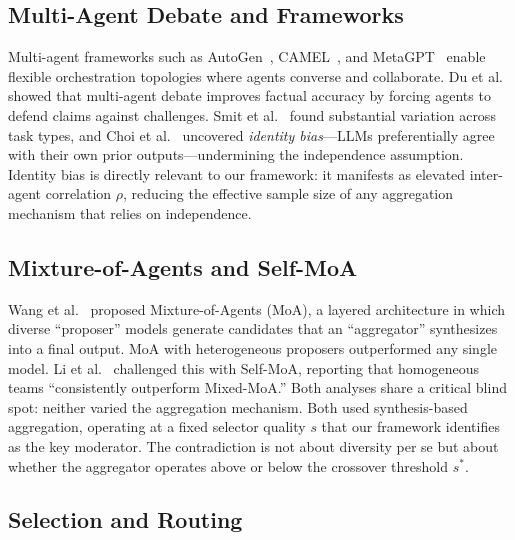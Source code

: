 \documentclass[10pt,twocolumn]{article}
\theoremstyle{remark}
\begin{document}
\subsection{Multi-Agent Debate and Frameworks}

Multi-agent frameworks such as AutoGen~\cite{wu2023autogen}, CAMEL~\cite{li2023camel}, and MetaGPT~\cite{hong2023metagpt} enable flexible orchestration topologies where agents converse and collaborate. Du et al.~\cite{du2023debate} showed that multi-agent debate improves factual accuracy by forcing agents to defend claims against challenges. Smit et al.~\cite{smit2023mad} found substantial variation across task types, and Choi et al.~\cite{choi2025identity} uncovered \emph{identity bias}---LLMs preferentially agree with their own prior outputs---undermining the independence assumption. Identity bias is directly relevant to our framework: it manifests as elevated inter-agent correlation $\rho$, reducing the effective sample size of any aggregation mechanism that relies on independence.

\subsection{Mixture-of-Agents and Self-MoA}

Wang et al.~\cite{wang2024mixture} proposed Mixture-of-Agents (MoA), a layered architecture in which diverse ``proposer'' models generate candidates that an ``aggregator'' synthesizes into a final output. MoA with heterogeneous proposers outperformed any single model. Li et al.~\cite{li2025self} challenged this with Self-MoA, reporting that homogeneous teams ``consistently outperform Mixed-MoA.'' Both analyses share a critical blind spot: neither varied the aggregation mechanism. Both used synthesis-based aggregation, operating at a fixed selector quality $s$ that our framework identifies as the key moderator. The contradiction is not about diversity per se but about whether the aggregator operates above or below the crossover threshold $s^*$.

\subsection{Selection and Routing}
\end{document}
